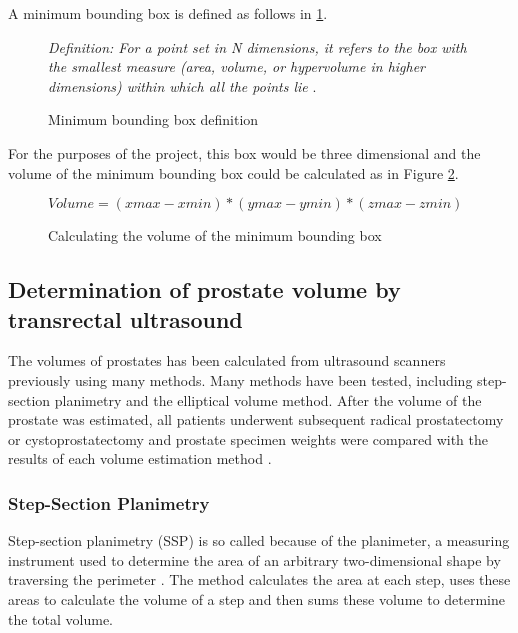 A minimum bounding box is defined as follows in \ref{fig:bounding_box_definition}.\\

\begin{figure}[h]
\textit{Definition: For a point set in N dimensions, it refers to the box with the smallest measure (area, volume, or hypervolume in higher dimensions) within which all the points lie} \cite{Barequet2001}.
\caption {Minimum bounding box definition}
\label{fig:bounding_box_definition}
\end{figure}

For the purposes of the project, this box would be three dimensional and the volume of the minimum bounding box could be calculated as in Figure \ref{fig:calculating_the_volume_of_the_minimum_bounding_box}.\\

\begin{figure}[h]
\begin{center}
$Volume = (xmax -xmin) * (ymax - ymin) * (zmax - zmin)$
\end{center}
\caption{Calculating the volume of the minimum bounding box}
\label{fig:calculating_the_volume_of_the_minimum_bounding_box}
\end{figure}

\subsection{Determination of prostate volume by transrectal ultrasound}
The volumes of prostates has been calculated from ultrasound scanners previously using many methods. 
Many methods have been tested, including step-section planimetry and the elliptical volume method. After the volume of the prostate was estimated, all patients underwent subsequent radical prostatectomy or cystoprostatectomy and prostate specimen weights were compared with the results of each volume estimation method \cite{K1991}.\\ 

\subsubsection{Step-Section Planimetry}
Step-section planimetry (SSP) is so called because of the planimeter, a measuring instrument used to determine the area of an arbitrary two-dimensional shape by traversing the perimeter \cite{Bryant2011}. 
The method calculates the area at each step, uses these areas to calculate the volume of a step and then sums these volume to determine the total volume.\\

